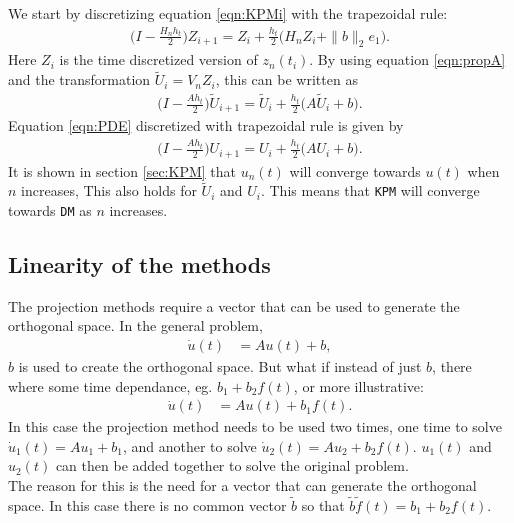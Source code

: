 \noindent We start by discretizing equation \eqref{eqn:KPMi} with the trapezoidal rule:
\begin{equation*}
\begin{aligned}
\Big(I-\frac{H_n h_t}{2}\Big) Z_{i+1} = Z_i + \frac{h_t}{2} \big( H_n Z_i + \| b \|_2 e_1 \big) .
\end{aligned}
\end{equation*}
Here $Z_i$ is the time discretized version of $z_n(t_i)$.
By using equation \eqref{eqn:propA} and the transformation $\tilde{U}_i = V_n Z_i$, this can be written as
\begin{equation*}
\begin{aligned}
\Big(I-\frac{Ah_t}{2} \Big) \tilde{U}_{i+1} =  \tilde{U}_i + \frac{h_t}{2} \big( A \tilde{U}_i +b \big) .
\end{aligned}
\end{equation*}
Equation \eqref{eqn:PDE} discretized with trapezoidal rule is given by
\begin{equation*}
\begin{aligned}
\Big(I-\frac{Ah_t}{2} \Big) U_{i+1} =  U_i + \frac{h_t}{2} \big( A U_i +b \big) .
\end{aligned}
\end{equation*}
It is shown in section \ref{sec:KPM} that $u_n(t)$ will converge towards $u(t)$ when $n$ increases, This also holds for $\tilde{U}_i$ and $ U_i $. This means that \texttt{KPM} will converge towards \texttt{DM} as $n$ increases.

\subsection{Linearity of the methods} %
The projection methods require a vector that can be used to generate the orthogonal space. In the general problem,
\begin{equation*}
\begin{aligned}
\dot{u}(t) &= Au(t) + b,
\end{aligned}
\end{equation*} 
$b$ is used to create the orthogonal space. But what if instead of just $b$, there where some time dependance, eg. $b_1 + b_2f(t)$, or more illustrative:
\begin{equation*}
\begin{aligned}
\dot{u}(t) &= Au(t) + b_1 f(t).
\end{aligned}
\end{equation*} 
In this case the projection method needs to be used two times, one time to solve $ \dot{u}_1(t) = Au_1 + b_1 $, and another to solve $ \dot{u}_2(t) = Au_2 + b_2f(t) $. $u_1(t)$ and $u_2(t)$ can then be added together to solve the original problem. \\
The reason for this is the need for a vector that can generate the orthogonal space. In this case there is no common vector $\tilde{b}$ so that $\tilde{b} \tilde{f}(t) = b_1 +b_2 f(t)$. \\

